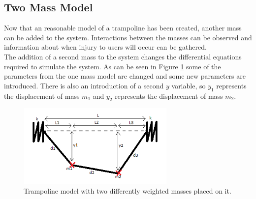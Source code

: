 
\subsection{Two Mass Model}\label{2mm}

\noindent Now that an reasonable model of a trampoline has been created, another mass can be added to the system. Interactions between the masses can be observed and information about when injury to users will occur can be gathered. \\ %

\noindent The addition of a second mass to the system changes the differential equations required to simulate the system. As can be seen in Figure \ref{fig:system2} some of the parameters from the one mass model are changed and some new parameters are introduced. There is also an introduction of a second $y$ variable, so $y_1$ represents the displacement of mass $m_1$ and $y_2$ represents the displacement of mass $m_2$. \\

\begin{figure}[H]
	\centering
	\includegraphics[width=0.6\linewidth, height=1.6in]{system2.png}
	\caption{Trampoline model with two differently weighted masses placed on it.}\label{fig:system2}
\end{figure}

